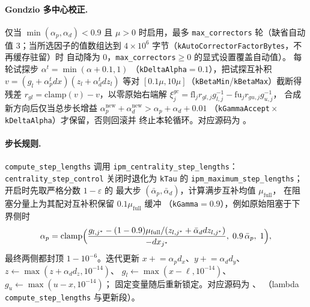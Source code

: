 \paragraph{Gondzio 多中心校正.}
仅当 $\min(\alpha_p, \alpha_d) < 0.9$ 且 $\mu > 0$ 时启用，最多
\texttt{max\_correctors} 轮（缺省自动值 $3$；当所选因子的值数组达到
$4\times10^{6}$ 字节（\texttt{kAutoCorrectorFactorBytes}，不再缓存驻留）时
自动降为 $0$，\texttt{max\_correctors}${}\ge 0$ 的显式设置覆盖自动值）。
每轮试探步 $\alpha^{t} = \min(\alpha + 0.1, 1)$
（\texttt{kDeltaAlpha}${}=0.1$），把试探互补积
$v = (g_l + \alpha_p^t d x)(z_l + \alpha_d^t d z_l)$ 等对
$[0.1\mu, 10\mu]$（\texttt{kBetaMin}/\texttt{kBetaMax}）截断得残差
$r_{gl} = \mathrm{clamp}(v) - v$，以零原始右端解
$\xi^{gc}_j = \mathrm{fl}_j r_{gl,j} g_{l,j}^{-1} -
\mathrm{fu}_j r_{gu,j} g_{u,j}^{-1}$，
合成新方向后仅当总步长增益
$\alpha_p^{\text{new}} + \alpha_d^{\text{new}} > \alpha_p + \alpha_d + 0.01$
（\texttt{kGammaAccept}${}\times{}$\texttt{kDeltaAlpha}）才保留，否则回滚并
终止本轮循环。对应源码为
。

\paragraph{步长规则.}
\texttt{compute\_step\_lengths} 调用 \texttt{ipm\_centrality\_step\_lengths}：
\texttt{centrality\_step\_control} 关闭时退化为 \texttt{kTau} 的
\texttt{ipm\_maximum\_step\_lengths}；开启时先取严格分数 $1-\varepsilon$ 的
最大步 $(\bar\alpha_p, \bar\alpha_d)$，计算满步互补均值 $\mu_{\text{full}}$，
在阻塞分量上为其配对互补积保留 $0.1 \mu_{\text{full}}$ 缓冲
（\texttt{kGamma}${}=0.9$），例如原始阻塞于下界侧时
\begin{equation}
  \alpha_p = \mathrm{clamp}\Bigl(
  \frac{g_{l,j^*} - (1 - 0.9)\mu_{\text{full}}/
  (z_{l,j^*} + \bar\alpha_d d z_{l,j^*})}{-d x_{j^*}},\;
  0.9\,\bar\alpha_p,\; 1\Bigr),
  \label{eq:ipmlp:centrality-step}
\end{equation}
最终两侧都封顶 $1 - 10^{-6}$。迭代更新
$x \mathrel{+}= \alpha_p d_x$、$y \mathrel{+}= \alpha_d d_y$、
$z \leftarrow \max(z + \alpha_d d_z, 10^{-14})$、
$g_l \leftarrow \max(x - \ell, 10^{-14})$、$g_u \leftarrow \max(u - x, 10^{-14})$；
固定变量随后重新锁定。对应源码为
、
（lambda \texttt{compute\_step\_lengths} 与更新段）。

